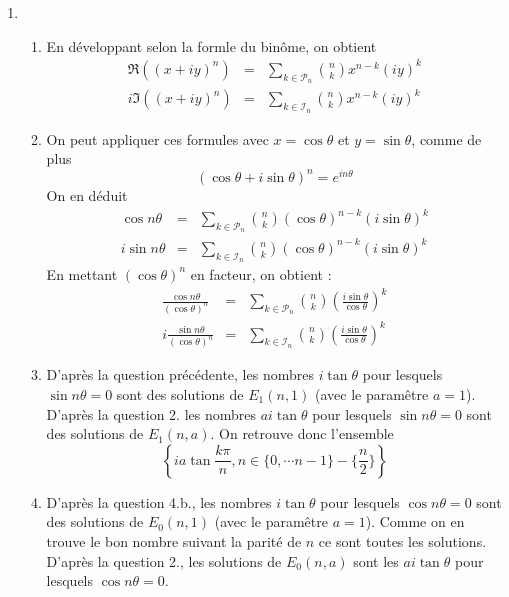 \begin{enumerate}
\item \begin{enumerate}
 \item En développant selon la formle du binôme, on obtient
\begin{eqnarray*}
 \Re \left( (x+iy)^n\right)  &=& \sum_{k\in \mathcal P _n}\binom{n}{k}x^{n-k} (iy)^{k} \\
 i \Im \left( (x+iy)^n\right)  &=& \sum_{k\in \mathcal I _n}\binom{n}{k}x^{n-k} (iy)^{k}
\end{eqnarray*}
\item On peut appliquer ces formules avec $x=\cos \theta$ et $y=\sin \theta$, comme de plus
\begin{displaymath}
 (\cos \theta + i\sin\theta)^n = e^{in\theta}
\end{displaymath}
On en déduit
\begin{eqnarray*}
 \cos n\theta  &=& \sum_{k\in \mathcal P _n}\binom{n}{k}(\cos \theta)^{n-k} (i\sin \theta)^{k} \\
 i \sin n\theta  &=& \sum_{k\in \mathcal I _n}\binom{n}{k}(\cos \theta)^{n-k} (i\sin \theta)^{k}
\end{eqnarray*}
En mettant $(\cos \theta )^n$ en facteur, on obtient :
\begin{eqnarray*}
\frac{\cos n\theta}{(\cos \theta )^n}   &=& \sum_{k\in \mathcal P _n}\binom{n}{k}\left( \frac{i\sin \theta}{\cos \theta}\right) ^{k} \\
 i \frac{\sin n\theta}{(\cos \theta )^n}   &=& \sum_{k\in \mathcal I _n}\binom{n}{k}\left( \frac{i\sin \theta}{\cos \theta}\right) ^{k} 
\end{eqnarray*}
\item D'après la question précédente, les nombres $i\tan \theta$ pour lesquels $\sin n\theta = 0$ sont des solutions de $E_1(n,1)$ (avec le paramêtre $a=1$). D'après la question 2. les nombres $ai\tan \theta$ pour lesquels $\sin n\theta = 0$ sont des solutions de $E_1(n,a)$. On retrouve donc l'ensemble
\begin{displaymath}
\left\lbrace ia \tan \frac{k\pi}{n}, n\in \{0,\cdots n-1\}-\{\frac{n}{2}\}\right\rbrace 
\end{displaymath}

\item D'après la question 4.b., les nombres $i\tan \theta$ pour lesquels $\cos n\theta = 0$ sont des solutions de $E_0(n,1)$ (avec le paramêtre $a=1$). Comme on en trouve le bon nombre suivant la parité de $n$ ce sont toutes les solutions. D'après la question 2., les solutions de $E_0(n,a)$ sont les $ai\tan \theta$ pour lesquels $\cos n\theta = 0$.
\end{enumerate}

\end{enumerate}
